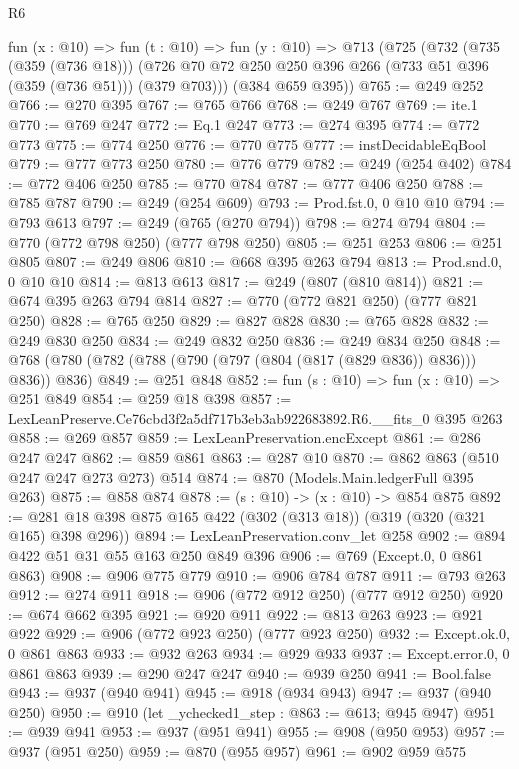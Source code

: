 \begin{lexlean}{R6}
\begin{coremodule}
  fun (x : @10) =>
  fun (t : @10) =>
  fun (y : @10) =>
  @713
    (@725
      (@732
        (@735 (@359 (@736 @18)))
        (@726 @70 @72 @250 @250 @396 @266 (@733 @51 @396 (@359 (@736 @51))) (@379 @703)))
      (@384 @659 @395))
@765 := @249 @252
@766 := @270 @395
@767 := @765 @766
@768 := @249 @767
@769 := ite.{1}
@770 := @769 @247
@772 := Eq.{1} @247
@773 := @274 @395
@774 := @772 @773
@775 := @774 @250
@776 := @770 @775
@777 := instDecidableEqBool
@779 := @777 @773 @250
@780 := @776 @779
@782 := @249 (@254 @402)
@784 := @772 @406 @250
@785 := @770 @784
@787 := @777 @406 @250
@788 := @785 @787
@790 := @249 (@254 @609)
@793 := Prod.fst.{0, 0} @10 @10
@794 := @793 @613
@797 := @249 (@765 (@270 @794))
@798 := @274 @794
@804 := @770 (@772 @798 @250) (@777 @798 @250)
@805 := @251 @253
@806 := @251 @805
@807 := @249 @806
@810 := @668 @395 @263 @794
@813 := Prod.snd.{0, 0} @10 @10
@814 := @813 @613
@817 := @249 (@807 (@810 @814))
@821 := @674 @395 @263 @794 @814
@827 := @770 (@772 @821 @250) (@777 @821 @250)
@828 := @765 @250
@829 := @827 @828
@830 := @765 @828
@832 := @249 @830 @250
@834 := @249 @832 @250
@836 := @249 @834 @250
@848 := @768 (@780 (@782 (@788 (@790 (@797 (@804 (@817 (@829 @836)) @836))) @836)) @836)
@849 := @251 @848
@852 := fun (s : @10) => fun (x : @10) => @251 @849
@854 := @259 @18 @398
@857 := LexLeanPreserve.Ce76cbd3f2a5df717b3eb3ab922683892.R6.__fits_0 @395 @263
@858 := @269 @857
@859 := LexLeanPreservation.encExcept
@861 := @286 @247 @247
@862 := @859 @861
@863 := @287 @10
@870 := @862 @863 (@510 @247 @247 @273 @273) @514
@874 := @870 (Models.Main.ledgerFull @395 @263)
@875 := @858 @874
@878 := (s : @10) -> (x : @10) -> @854 @875
@892 := @281 @18 @398 @875 @165 @422 (@302 (@313 @18)) (@319 (@320 (@321 @165) @398 @296))
@894 := LexLeanPreservation.conv_let @258
@902 := @894 @422 @51 @31 @55 @163 @250 @849 @396
@906 := @769 (Except.{0, 0} @861 @863)
@908 := @906 @775 @779
@910 := @906 @784 @787
@911 := @793 @263
@912 := @274 @911
@918 := @906 (@772 @912 @250) (@777 @912 @250)
@920 := @674 @662 @395
@921 := @920 @911
@922 := @813 @263
@923 := @921 @922
@929 := @906 (@772 @923 @250) (@777 @923 @250)
@932 := Except.ok.{0, 0} @861 @863
@933 := @932 @263
@934 := @929 @933
@937 := Except.error.{0, 0} @861 @863
@939 := @290 @247 @247
@940 := @939 @250
@941 := Bool.false
@943 := @937 (@940 @941)
@945 := @918 (@934 @943)
@947 := @937 (@940 @250)
@950 := @910 (let _ychecked1_step : @863 := @613; @945 @947)
@951 := @939 @941
@953 := @937 (@951 @941)
@955 := @908 (@950 @953)
@957 := @937 (@951 @250)
@959 := @870 (@955 @957)
@961 := @902 @959 @575

\end{coremodule}
\end{lexlean}

